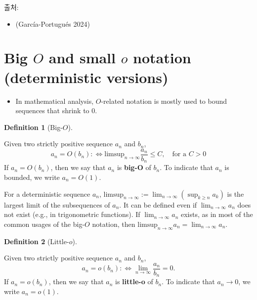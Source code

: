 \documentclass[
  13pt,
  letterpaper,
  DIV=11,
  numbers=noendperiod]{scrreprt}
\providecommand{\tightlist}{%
  \setlength{\itemsep}{0pt}\setlength{\parskip}{0pt}}\usepackage{longtable,booktabs,array}
\theoremstyle{plain}
\theoremstyle{definition}
\theoremstyle{definition}
\newtheorem{definition}{Definition}[chapter]
\theoremstyle{plain}
\theoremstyle{definition}
\theoremstyle{plain}
\theoremstyle{remark}
\begin{document}
출처:

\begin{itemize}
\tightlist
\item
  (García-Portugués 2024)
\end{itemize}

\section{\texorpdfstring{Big \(O\) and small \(o\) notation
(deterministic
versions)}{Big O and small o notation (deterministic versions)}}\label{big-o-and-small-o-notation-deterministic-versions}

\begin{itemize}
\tightlist
\item
  In mathematical analysis, \(O\)-related notation is mostly used to
  bound sequences that shrink to \(0\).
\end{itemize}

\begin{definition}[Big-\(O\)]\protect\hypertarget{def-bigoh}{}\label{def-bigoh}

Given two strictly positive sequence \(a_n\) and \(b_n\), \[
a_n = O(b_n): \Longleftrightarrow \text{limsup}_{n\rightarrow \infty}\frac{a_n}{b_n} \leq C, \quad{} \text{for a } C>0
\] If \(a_n = O(b_n)\), then we say that \(a_n\) is \textbf{big-O} of
\(b_n\). To indicate that \(a_n\) is bounded, we write \(a_n = O(1)\).

\end{definition}

For a deterministic sequence \(a_n\),
\(\text{limsup}_{n\rightarrow \infty}:=\lim_{n\rightarrow \infty}(\sup_{k \geq n} a_k)\)
is the largest limit of the subsequences of \(a_n\). It can be defined
even if \(\lim_{n\rightarrow\infty}a_n\) does not exist (e.g., in
trigonometric functions). If \(\lim_{n\rightarrow\infty} a_n\) exists,
as in most of the common usages of the big-\(O\) notation, then
\(\text{limsup}_{n\rightarrow\infty}a_n = \lim_{n\rightarrow\infty}a_n\).

\begin{definition}[Little-\(o\)]\protect\hypertarget{def-littleoh}{}\label{def-littleoh}

Given two strictly positive sequence \(a_n\) and \(b_n\), \[
a_n = o(b_n): \Longleftrightarrow \lim_{n\rightarrow\infty} \frac{a_n}{b_n} = 0.
\] If \(a_n = o(b_n)\), then we say that \(a_n\) is \textbf{little-o} of
\(b_n\). To indicate that \(a_n\rightarrow 0\), we write \(a_n = o(1)\).

\end{definition}
\end{document}
